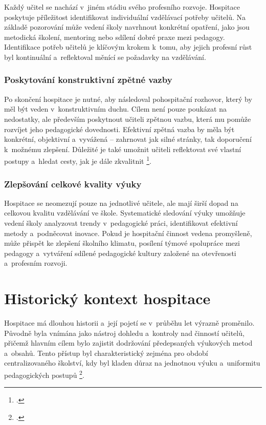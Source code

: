 Každý učitel se nachází v~jiném stádiu svého profesního rozvoje. Hospitace poskytuje příležitost identifikovat individuální vzdělávací potřeby učitelů. Na základě pozorování může vedení školy navrhnout konkrétní opatření, jako jsou metodická školení, mentoring nebo sdílení dobré praxe mezi pedagogy. Identifikace potřeb učitelů je klíčovým krokem k~tomu, aby jejich profesní růst byl kontinuální a~reflektoval měnící se požadavky na vzdělávání.

\subsubsection{Poskytování konstruktivní zpětné vazby}

Po skončení hospitace je nutné, aby následoval pohospitační rozhovor, který by měl být veden v~konstruktivním duchu. Cílem není pouze poukázat na nedostatky, ale především poskytnout učiteli zpětnou vazbu, která mu pomůže rozvíjet jeho pedagogické dovednosti. Efektivní zpětná vazba by měla být konkrétní, objektivní a~vyvážená – zahrnovat jak silné stránky, tak doporučení k~možnému zlepšení. Důležité je také umožnit učiteli reflektovat své vlastní postupy a~hledat cesty, jak je dále zkvalitnit \footcite[11]{rozvijejici-hospitace}. 

\subsubsection{Zlepšování celkové kvality výuky}

Hospitace se neomezují pouze na jednotlivé učitele, ale mají širší dopad na celkovou kvalitu vzdělávání ve škole. Systematické sledování výuky umožňuje vedení školy analyzovat trendy v~pedagogické práci, identifikovat efektivní metody a~podněcovat inovace. Pokud je hospitační činnost vedena promyšleně, může přispět ke zlepšení školního klimatu, posílení týmové spolupráce mezi pedagogy a~vytváření sdílené pedagogické kultury založené na otevřenosti a~profesním rozvoji.


\section{Historický kontext hospitace}

Hospitace má dlouhou historii a~její pojetí se v~průběhu let výrazně proměnilo. Původně byla vnímána jako nástroj dohledu a~kontroly nad činností učitelů, přičemž hlavním cílem bylo zajistit dodržování předepsaných výukových metod a~obsahů. Tento přístup byl charakteristický zejména pro období centralizovaného školství, kdy byl kladen důraz na jednotnou výuku a~uniformitu pedagogických postupů \footcite[119]{ped-proces-rizeni}.

